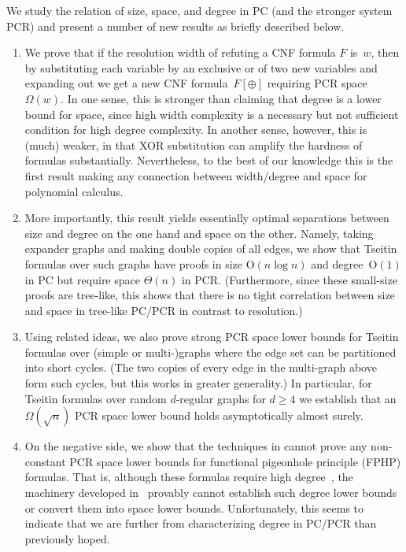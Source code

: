\documentclass[11pt]{article}
\numberwithin{equation}{section}
\theoremstyle{definition}
\theoremstyle{plain}
\theoremstyle{plain}
\theoremstyle{definition}
\newcommand{\bigoh}[1]{\mathrm{O} ( #1 )}
\newcommand{\bigtheta}[1]{\Theta ( #1 )}
\newcommand{\bigomega}[1]{\Omega ( #1 )}
\newcommand{\substform}[2]{{#1}[{#2}]}
\newcommand{\xor}{\oplus}
\begin{document}
We study the relation of size, space, and degree in PC (and the 
stronger system PCR) and present
a number of new results as 
briefly described below.
%
\begin{enumerate}
  \item We prove that if the resolution width of refuting a CNF
  formula $F$ is~$w$, then by substituting each variable by an
  exclusive or of two new variables and expanding out we get a new CNF
  formula~$\substform{F}{\xor}$ requiring PCR space $\bigomega{w}$.
  In one sense, this is stronger than claiming that degree is a lower
  bound for space, since high width complexity is a necessary but not
  sufficient condition for high degree complexity. In another sense,
  however, this is (much) weaker, in that XOR substitution can amplify
  the hardness of formulas substantially. Nevertheless, to the best of
  our knowledge this is the first result making any connection between
  width/degree and space for polynomial calculus.%

\item
  More importantly, this result yields essentially optimal
  separations between size and degree on the one hand and space on
  the other. Namely, taking expander graphs and making
  double copies of all edges, we show that Tseitin formulas
  over such graphs
  have proofs in size $\bigoh{n \log n }$ and
  \mbox{degree $\bigoh{1}$} in PC but require
  space $\bigtheta{n}$ in PCR.
  (Furthermore, since these small-size proofs are tree-like, this
  shows that there is no tight correlation between size and space in
  tree-like PC/PCR in contrast to
  resolution.)

\item
  Using related ideas, we also prove strong PCR space
  lower bounds for Tseitin formulas over 
  (simple or \mbox{multi-)graphs}
%
  where the edge set can be partitioned into %
  short  %
  cycles.
  (The two copies of every edge in the multi-graph above form such
  cycles, but this works in greater generality.)
  In particular, for Tseitin formulas over random $d$-regular graphs
  for $d \geq 4$ we establish that \mbox{an $\bigomega{\sqrt{n}}$} PCR
  space lower bound holds asymptotically almost surely.%

\item
  On the negative side, we show that the
  techniques in
  \cite{BG15Framework}
  cannot prove any non-constant PCR space lower bounds for
  functional pigeonhole principle (FPHP) formulas.
  That is, although these formulas require high 
  degree~\cite{MN15GeneralizedMethodDegree},
  the machinery developed in~\cite{BG15Framework}
  provably cannot establish such degree lower bounds or convert them
  into space lower bounds.
  Unfortunately, this seems to indicate that we are further from
  characterizing degree in PC/PCR than previously hoped.
\end{enumerate}
\end{document}
